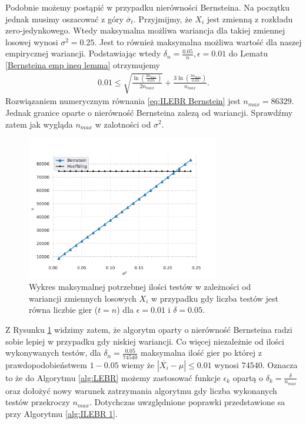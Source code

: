 \documentclass[inzynierska]{pwr_wmat_praca_dyplomowa}
\theoremstyle{plain}
\numberwithin{theorem}{chapter}
\theoremstyle{definition}
\numberwithin{theorem}{chapter}
\begin{document}
	Podobnie możemy postąpić w przypadku nierówności Bernsteina.
	Na początku jednak musimy oszacować z góry $\overline{\sigma}_t$.
	Przyjmijmy, że $X_i$ jest zmienną z rozkładu zero-jedynkowego.
	Wtedy maksymalna możliwa wariancja dla takiej zmiennej losowej wynosi $\sigma^2 = 0.25$. Jest to również maksymalna możliwa wartość dla naszej empirycznej wariancji. Podstawiając wtedy $\delta_n = \frac{0.05}{n}, \epsilon = 0.01$ do Lematu \ref{Bernsteina emp ineq lemma} otrzymujemy
	\begin{gather}
		\label{eq:ILEBR Bernstein}
		0.01 \le \sqrt{\frac{\ln(\frac{3n_{max}}{0.05})}{2n_{max}}} + \frac{3  \ln(\frac{3n_{max}}{0.05})}{n_{max}}.
	\end{gather}
	Rozwiązaniem numerycznym równania \eqref{eq:ILEBR Bernstein} jest $n_{max}=86329$. Jednak granice oparte o nierówność Bernsteina zalezą od wariancji. Sprawdźmy zatem jak wygląda $n_{max}$ w zalotności od $\sigma^2$.
	\begin{figure}
		\centering
		\includegraphics[width=0.75\textwidth]{imagens/t_eq_n.pdf}
		\caption{Wykres maksymalnej potrzebnej ilości testów w zależności od wariancji zmiennych losowych  $X_i$ w przypadku gdy liczba testów jest równa liczbie gier ($t = n$) dla $\epsilon=0.01$ i $\delta = 0.05$.}
		\label{fig:t_eq_n}
	\end{figure}
	Z Rysunku \ref{fig:t_eq_n} widzimy zatem, że algorytm oparty o nierówność Bernsteina radzi sobie lepiej w przypadku gdy niskiej wariancji. Co więcej niezależnie od ilości wykonywanych testów, dla $\delta_n = \frac{0.05}{74540}$ maksymalna ilość gier po której z prawdopodobieństwem $1-0.05$ wiemy że $|\overline{X_i} - \mu| \le 0.01$ wynosi $74540$. Oznacza to że do Algorytmu \ref{alg:LEBR} możemy zastosować funkcje $\epsilon_k$ opartą o $\delta_k = \frac{\delta}{n_{max}}$ oraz dołożyć nowy warunek zatrzymania algorytmu gdy liczba wykonanych testów przekroczy $n_{max}$. Dotychczas uwzględnione poprawki przedstawione sa przy Algorytmu \ref{alg:ILEBR 1}.
\end{document}
